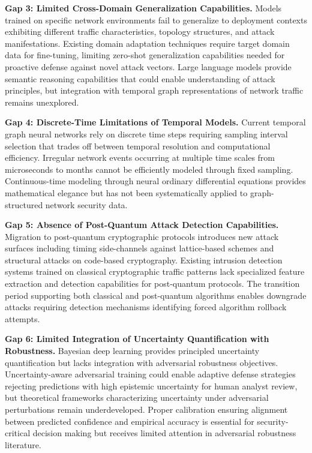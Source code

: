 \textbf{Gap 3: Limited Cross-Domain Generalization Capabilities.} Models trained on specific network environments fail to generalize to deployment contexts exhibiting different traffic characteristics, topology structures, and attack manifestations. Existing domain adaptation techniques require target domain data for fine-tuning, limiting zero-shot generalization capabilities needed for proactive defense against novel attack vectors. Large language models provide semantic reasoning capabilities that could enable understanding of attack principles, but integration with temporal graph representations of network traffic remains unexplored.

\textbf{Gap 4: Discrete-Time Limitations of Temporal Models.} Current temporal graph neural networks rely on discrete time steps requiring sampling interval selection that trades off between temporal resolution and computational efficiency. Irregular network events occurring at multiple time scales from microseconds to months cannot be efficiently modeled through fixed sampling. Continuous-time modeling through neural ordinary differential equations provides mathematical elegance but has not been systematically applied to graph-structured network security data.

\textbf{Gap 5: Absence of Post-Quantum Attack Detection Capabilities.} Migration to post-quantum cryptographic protocols introduces new attack surfaces including timing side-channels against lattice-based schemes and structural attacks on code-based cryptography. Existing intrusion detection systems trained on classical cryptographic traffic patterns lack specialized feature extraction and detection capabilities for post-quantum protocols. The transition period supporting both classical and post-quantum algorithms enables downgrade attacks requiring detection mechanisms identifying forced algorithm rollback attempts.

\textbf{Gap 6: Limited Integration of Uncertainty Quantification with Robustness.} Bayesian deep learning provides principled uncertainty quantification but lacks integration with adversarial robustness objectives. Uncertainty-aware adversarial training could enable adaptive defense strategies rejecting predictions with high epistemic uncertainty for human analyst review, but theoretical frameworks characterizing uncertainty under adversarial perturbations remain underdeveloped. Proper calibration ensuring alignment between predicted confidence and empirical accuracy is essential for security-critical decision making but receives limited attention in adversarial robustness literature.

